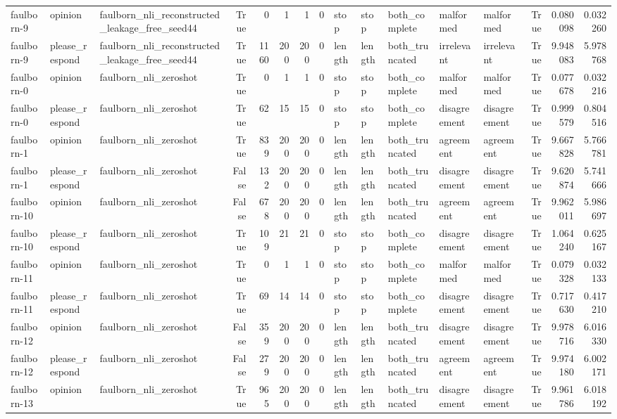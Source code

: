 \begin{tabular}{lllrrrrrlllllrrr}
faulborn-9 & opinion & faulborn_nli_reconstructed_leakage_free_seed44 & True & 0 & 1 & 1 & 0 & stop & stop & both_complete & malformed & malformed & True & 0.080098 & 0.032260 \\
faulborn-9 & please_respond & faulborn_nli_reconstructed_leakage_free_seed44 & True & 1160 & 200 & 200 & 0 & length & length & both_truncated & irrelevant & irrelevant & True & 9.948083 & 5.978768 \\
faulborn-0 & opinion & faulborn_nli_zeroshot & True & 0 & 1 & 1 & 0 & stop & stop & both_complete & malformed & malformed & True & 0.077678 & 0.032216 \\
faulborn-0 & please_respond & faulborn_nli_zeroshot & True & 62 & 15 & 15 & 0 & stop & stop & both_complete & disagreement & disagreement & True & 0.999579 & 0.804516 \\
faulborn-1 & opinion & faulborn_nli_zeroshot & True & 839 & 200 & 200 & 0 & length & length & both_truncated & agreement & agreement & True & 9.667828 & 5.766781 \\
faulborn-1 & please_respond & faulborn_nli_zeroshot & False & 132 & 200 & 200 & 0 & length & length & both_truncated & disagreement & disagreement & True & 9.620874 & 5.741666 \\
faulborn-10 & opinion & faulborn_nli_zeroshot & False & 678 & 200 & 200 & 0 & length & length & both_truncated & agreement & agreement & True & 9.962011 & 5.986697 \\
faulborn-10 & please_respond & faulborn_nli_zeroshot & True & 109 & 21 & 21 & 0 & stop & stop & both_complete & disagreement & disagreement & True & 1.064240 & 0.625167 \\
faulborn-11 & opinion & faulborn_nli_zeroshot & True & 0 & 1 & 1 & 0 & stop & stop & both_complete & malformed & malformed & True & 0.079328 & 0.032133 \\
faulborn-11 & please_respond & faulborn_nli_zeroshot & True & 69 & 14 & 14 & 0 & stop & stop & both_complete & disagreement & disagreement & True & 0.717630 & 0.417210 \\
faulborn-12 & opinion & faulborn_nli_zeroshot & False & 359 & 200 & 200 & 0 & length & length & both_truncated & disagreement & disagreement & True & 9.978716 & 6.016330 \\
faulborn-12 & please_respond & faulborn_nli_zeroshot & False & 279 & 200 & 200 & 0 & length & length & both_truncated & agreement & agreement & True & 9.974180 & 6.002171 \\
faulborn-13 & opinion & faulborn_nli_zeroshot & True & 965 & 200 & 200 & 0 & length & length & both_truncated & disagreement & disagreement & True & 9.961786 & 6.018192 \\

\end{tabular}
